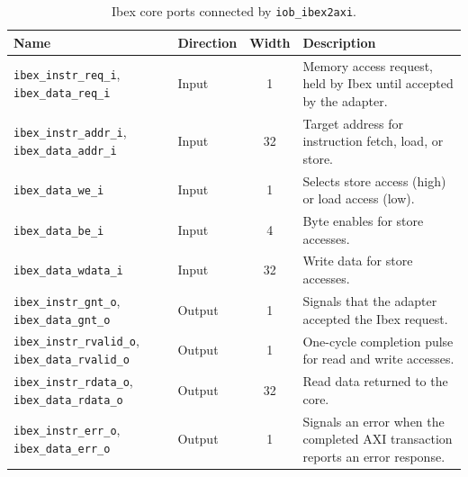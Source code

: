 \begin{table}[h]
\centering
\small
\setlength{\tabcolsep}{3.2pt}
\renewcommand{\arraystretch}{1.25}
\begin{tabularx}{\textwidth}{|l|l|c|X|}
\hline
\rowcolor{tableheader}\textbf{Name} &
\textbf{Direction} &
\textbf{Width} &
\textbf{Description} \\
\hline
\hline
\texttt{ibex\_instr\_req\_i}, \texttt{ibex\_data\_req\_i} &
Input & 1 &
Memory access request, held by Ibex until accepted by the adapter. \\
\hline
\texttt{ibex\_instr\_addr\_i}, \texttt{ibex\_data\_addr\_i} &
Input & 32 &
Target address for instruction fetch, load, or store. \\
\hline
\texttt{ibex\_data\_we\_i} &
Input & 1 &
Selects store access (high) or load access (low). \\
\hline
\texttt{ibex\_data\_be\_i} &
Input & 4 &
Byte enables for store accesses. \\
\hline
\texttt{ibex\_data\_wdata\_i} &
Input & 32 &
Write data for store accesses. \\
\hline
\texttt{ibex\_instr\_gnt\_o}, \texttt{ibex\_data\_gnt\_o} &
Output & 1 &
Signals that the adapter accepted the Ibex request. \\
\hline
\texttt{ibex\_instr\_rvalid\_o}, \texttt{ibex\_data\_rvalid\_o} &
Output & 1 &
One-cycle completion pulse for read and write accesses. \\
\hline
\texttt{ibex\_instr\_rdata\_o}, \texttt{ibex\_data\_rdata\_o} &
Output & 32 &
Read data returned to the core. \\
\hline
\texttt{ibex\_instr\_err\_o}, \texttt{ibex\_data\_err\_o} &
Output & 1 &
Signals an error when the completed \ac{AXI} transaction reports an error response. \\
\hline
\end{tabularx}
\caption{Ibex core ports connected by \texttt{iob\_ibex2axi}.}
\label{tab:ibex2axi_ibex}
\end{table}

